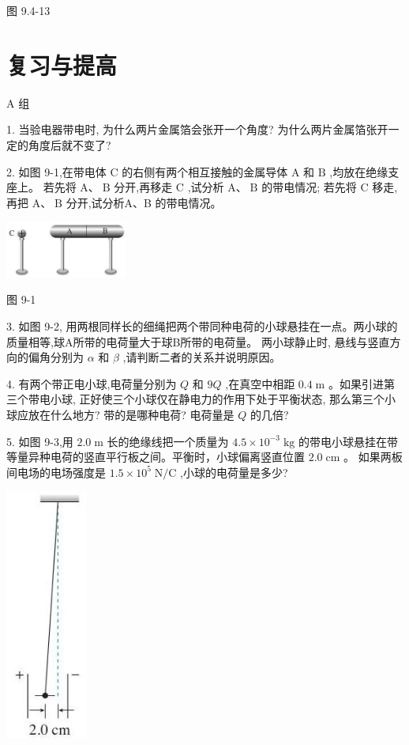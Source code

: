 \documentclass[10pt]{article}
\begin{document}
图 9.4-13

\section*{复习与提高}

A 组

1. 当验电器带电时, 为什么两片金属箔会张开一个角度? 为什么两片金属箔张开一定的角度后就不变了?

2. 如图 9-1,在带电体 \(\mathrm{C}\) 的右侧有两个相互接触的金属导体 \(\mathrm{A}\) 和 \(\mathrm{B}\) ,均放在绝缘支座上。 若先将 \(\mathrm{A}\text{、}\mathrm{\;B}\) 分开,再移走 \(\mathrm{C}\) ,试分析 \(\mathrm{A}\text{、}\mathrm{\;B}\) 的带电情况; 若先将 \(\mathrm{C}\) 移走,再把 \(\mathrm{A}\text{、}\mathrm{\;B}\) 分开,试分析A、B 的带电情况。

\begin{center}
\includegraphics[max width=0.3\textwidth]{images/01911d5f-8e38-70c0-b5b8-2b399bd115b6_28_558679.jpg}
\end{center}

图 9-1

3. 如图 9-2, 用两根同样长的细绳把两个带同种电荷的小球悬挂在一点。两小球的质量相等,球A所带的电荷量大于球B所带的电荷量。 两小球静止时, 悬线与竖直方向的偏角分别为 \(\alpha\) 和 \(\beta\) ,请判断二者的关系并说明原因。

4. 有两个带正电小球,电荷量分别为 \(Q\) 和 \({9Q}\) ,在真空中相距 \({0.4}\mathrm{\;m}\) 。如果引进第三个带电小球, 正好使三个小球仅在静电力的作用下处于平衡状态, 那么第三个小球应放在什么地方? 带的是哪种电荷? 电荷量是 \(Q\) 的几倍?

5. 如图 9-3,用 \({2.0}\mathrm{\;m}\) 长的绝缘线把一个质量为 \({4.5} \times {10}^{-3}\mathrm{\;{kg}}\) 的带电小球悬挂在带等量异种电荷的竖直平行板之间。平衡时，小球偏离竖直位置 \({2.0}\mathrm{\;{cm}}\) 。 如果两板间电场的电场强度是 \({1.5} \times {10}^{5}\mathrm{\;N}/\mathrm{C}\) ,小球的电荷量是多少?

\begin{center}
\includegraphics[max width=0.2\textwidth]{images/01911d5f-8e38-70c0-b5b8-2b399bd115b6_28_414266.jpg}
\end{center}
\end{document}

